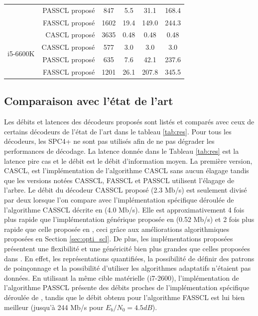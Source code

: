 \begin{table}[t]
{{\begin{tabular}{r|r|c|c c c}
        & PASSCL proposé                   & 847                            & 5.5             & 31.1            & 168.4           \\
        & FASSCL proposé                   & 1602                           & 19.4            & 149.0           & 244.3           \\
        \hline
        \multirow{4}{*}{i5-6600K}
        & CASCL proposé                    & 3635                           & 0.48            & 0.48            & 0.48            \\
        & CASSCL proposé                   & 577                            & 3.0             & 3.0             & 3.0             \\
        & PASSCL proposé                   & 635                            & 7.6             & 42.1            & 237.6           \\
        & FASSCL proposé                   & 1201                           & 26.1            & 207.8           & 345.5           \\
      \end{tabular}
      }}
    \end{table}

\subsection{Comparaison avec l'état de l'art}

Les débits et latences des décodeurs proposés sont listés et comparés avec ceux de certains décodeurs de l'état de l'art dans le tableau \ref{tab:res}. Pour tous les décodeurs, les \noeuds SPC4+ ne sont pas utilisés afin de ne pas dégrader les performances de décodage. La latence donnée dans le Tableau \ref{tab:res} est la latence \og pire cas \fg et le débit est le débit d'information moyen. La première version, CASCL, est l'implémentation de l'algorithme CASCL sans aucun élagage tandis que les versions notées CASSCL, FASSCL et PASSCL utilisent l'élagage de l'arbre. Le débit du décodeur CASSCL proposé (2.3 Mb/s) est seulement divisé par deux lorsque l'on compare avec l'implémentation spécifique déroulée de l'algorithme CASSCL décrite en \cite{sarkis_fast_2016} (4.0 Mb/s). Elle est approximativement 4 fois plus rapide que l'implémentation générique proposée en \cite{sarkis_increasing_2014} (0.52 Mb/s) et 2 fois plus rapide que celle proposée en \cite{shen_low-latency_2016}, ceci grâce aux améliorations algorithmiques proposées en Section \ref{sec:opti_scl}. De plus, les implémentations proposées présentent une flexibilité et une généricité bien plus grandes que celles proposées dans \cite{sarkis_increasing_2014,shen_low-latency_2016}. En effet, les représentations quantifiées, la possibilité de définir des patrons de poinçonnage et la possibilité d'utiliser les algorithmes adaptatifs n'étaient pas données. En utilisant la même cible matérielle (i7-2600), l'implémentation de l'algorithme PASSCL présente des débits proches de l'implémentation spécifique déroulée de \cite{sarkis_fast_2016}, tandis que le débit obtenu pour l'algorithme FASSCL est lui bien meilleur (jusqu'à 244 Mb/s pour $E_b/N_0=4.5dB$).

